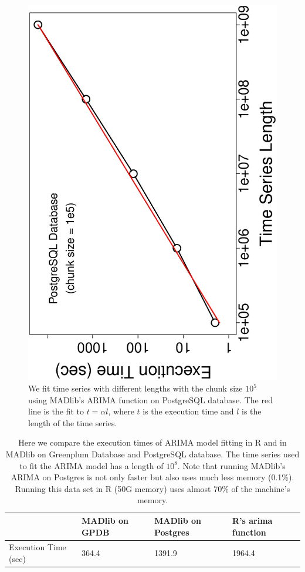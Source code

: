 \documentclass[english,10pt]{llncs}
\begin{document}
\begin{figure}[ht]
  \begin{centering}
    \includegraphics[angle=-90,scale=0.4]{pg_time_vs_size}
  \end{centering}
  \caption{\label{fig:pg_time_size} We fit time series with different
    lengths with the chunk size $10^5$ using MADlib's ARIMA function
    on PostgreSQL database. The red line is the fit to $t = \alpha l$,
    where $t$ is the execution time and $l$ is the length of the time
    series.}
\end{figure}

\begin{table}[ht]
  \begin{tabular}{|l|l|l|l|}
    \hline
    ~ & MADlib on GPDB & MADlib on Postgres & R's arima function \\ \hline
    Execution Time (sec) & 364.4 & 1391.9 & 1964.4 \\ \hline
  \end{tabular}
  \caption{\label{tbl:compare_R} Here we compare the execution times
    of ARIMA model fitting in R and in MADlib on Greenplum Database 
    and PostgreSQL database. The time series used to fit the ARIMA 
    model has a length of $10^8$. Note that running MADlib's ARIMA
    on Postgres is not only faster but also uses much less memory (0.1\%). 
    Running this data set in R (50G memory) uses almost 70\% of the
    machine's memory.}
\end{table}
\end{document}
